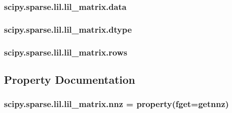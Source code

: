 \subsubsection[{data}]{\setlength{\rightskip}{0pt plus 5cm}scipy.\+sparse.\+lil.\+lil\+\_\+matrix.\+data}\label{classscipy_1_1sparse_1_1lil_1_1lil__matrix_a5fc9c63ea62a2cffe37b7d0bc6694ec9}
\hypertarget{classscipy_1_1sparse_1_1lil_1_1lil__matrix_ab601e45efefff855971e7bbe3a1369cf}{}
\subsubsection[{dtype}]{\setlength{\rightskip}{0pt plus 5cm}scipy.\+sparse.\+lil.\+lil\+\_\+matrix.\+dtype}\label{classscipy_1_1sparse_1_1lil_1_1lil__matrix_ab601e45efefff855971e7bbe3a1369cf}
\hypertarget{classscipy_1_1sparse_1_1lil_1_1lil__matrix_a8af240f190999e0594d7a71d499c3f77}{}
\subsubsection[{rows}]{\setlength{\rightskip}{0pt plus 5cm}scipy.\+sparse.\+lil.\+lil\+\_\+matrix.\+rows}\label{classscipy_1_1sparse_1_1lil_1_1lil__matrix_a8af240f190999e0594d7a71d499c3f77}


\subsection{Property Documentation}
\hypertarget{classscipy_1_1sparse_1_1lil_1_1lil__matrix_ab4d87e3e76b651d3b3e7590e4a60a0f3}{}
\subsubsection[{nnz}]{\setlength{\rightskip}{0pt plus 5cm}scipy.\+sparse.\+lil.\+lil\+\_\+matrix.\+nnz = property(fget={\bf getnnz})\hspace{0.3cm}{\ttfamily [static]}}\label{classscipy_1_1sparse_1_1lil_1_1lil__matrix_ab4d87e3e76b651d3b3e7590e4a60a0f3}
\hypertarget{classscipy_1_1sparse_1_1lil_1_1lil__matrix_a1ce3967d5fd211a7afc9d0b17d0c42c0}{}
